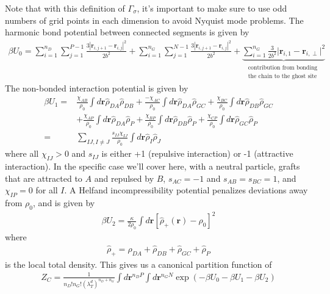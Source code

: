 \documentclass{article}
\begin{document}
  Note that with this definition of $\Gamma_\sigma$, it's important to make sure
    to use odd numbers of grid points in each dimension to avoid Nyquist mode
    problems.
  The harmonic bond potential between connected segments is given by
  \begin{align*}
    \beta U_0 =
      \sum_{i=1}^{n_D} \sum_{j=1}^{P-1}
      \frac{3 \left| \mathbf{r}_{i,j+1} - \mathbf{r}_{i,j} \right| ^ 2 }
           { 2 b^2 }
      +
      \sum_{i=1}^{n_G} \sum_{j=1}^{N-1}
      \frac{3 \left| \mathbf{r}_{i,j+1} - \mathbf{r}_{i,j} \right| ^ 2 }
           { 2 b^2 }
      +
      \underbrace{\sum_{i=1}^{n_G}  \frac{3}{2b^2} 
      \vert \mathbf{r}_{i,1} - \mathbf{r}_{i,\perp} \vert^2}_
      {\substack{\text{contribution from bonding } \\
      \text{the chain  to the ghost site }}}
  \end{align*}
  The non-bonded interaction potential is given by
  \begin{align*}
    \beta U_1 =&
      \frac{\chi_{AB}}{\rho_0} \int d\mathbf{r} \hat{\rho}_{DA} \hat{\rho}_{DB}
      + \frac{-\chi_{AC}}{\rho_0} \int d\mathbf{r} \hat{\rho}_{DA} \hat{\rho}_{GC}
      + \frac{\chi_{BC}}{\rho_0} \int d\mathbf{r} \hat{\rho}_{DB} \hat{\rho}_{GC}
      \\
      &+ \frac{\chi_{AP}}{\rho_0} \int d\mathbf{r} \hat{\rho}_{DA} \hat{\rho}_P
      + \frac{\chi_{BP}}{\rho_0} \int d\mathbf{r} \hat{\rho}_{DB} \hat{\rho}_P
      + \frac{\chi_{CP}}{\rho_0} \int d\mathbf{r} \hat{\rho}_{GC} \hat{\rho}_P \\
    =&
      \sum_{IJ, I \ne J} \frac{s_{IJ}\chi_{IJ}}{\rho_0}
      \int d \mathbf{r} \hat{\rho}_I \hat{\rho}_J
  \end{align*}
  where all $\chi_{IJ} > 0$ and $s_{IJ}$ is either +1 (repulsive interaction) or
    -1 (attractive interaction).
  In the specific case we'll cover here, with a neutral particle, grafts that
    are attracted to $A$ and repulsed by $B$, $s_{AC} = -1$ and
    $s_{AB} = s_{BC} = 1$, and $\chi_{IP} = 0$ for all $I$.
  A Helfand incompressibility potential penalizes deviations away from $\rho_0$,
    and is given by
  \begin{align*}
    \beta U_2 = \frac{\kappa}{2 \rho_0} \int d \mathbf{r}
      \left[ \hat{\rho}_+ (\mathbf{r}) - \rho_0 \right] ^ 2
  \end{align*}
  where
  \begin{align*}
    \hat{\rho}_+ =
      \hat{\rho}_{DA} + \hat{\rho}_{DB} + \hat{\rho}_{GC} + \hat{\rho}_P
  \end{align*}
    is the local total density.
  This gives us a canonical partition function of
  \begin{align*}
    Z_C = \frac{1}{n_D!n_G! \left( \lambda_T^d \right)^{n_D+n_G}}
      \int d \mathbf{r}^{n_DP} \int d \mathbf{r}^{n_GN}
      \exp \left( -\beta U_0 - \beta U_1 - \beta U_2 \right)
  \end{align*}
  
\end{document}
